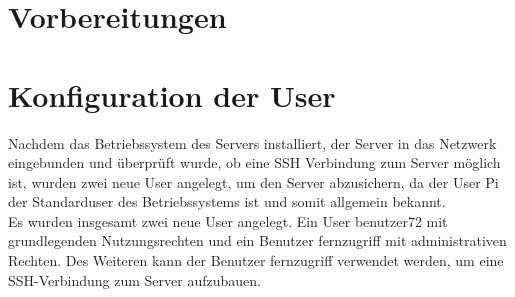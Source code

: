 \documentclass[a4paper, 11pt]{scrartcl}
\begin{document}
\section{Vorbereitungen}

\section{Konfiguration der User}
Nachdem das Betriebssystem des Servers installiert, der Server in das Netzwerk eingebunden und überprüft wurde, ob eine SSH Verbindung zum Server möglich ist, wurden zwei neue User angelegt, um den Server
abzusichern, da der User \glqq Pi\grqq{} der Standarduser des Betriebssystems ist und somit allgemein bekannt.
\\
Es wurden insgesamt zwei neue User angelegt. Ein User \glqq benutzer72\grqq{} mit grundlegenden Nutzungsrechten und ein Benutzer \glqq fernzugriff\grqq{} mit administrativen Rechten. Des Weiteren kann der
Benutzer \glqq fernzugriff\grqq{} verwendet werden, um eine SSH-Verbindung zum Server aufzubauen.
\end{document}
